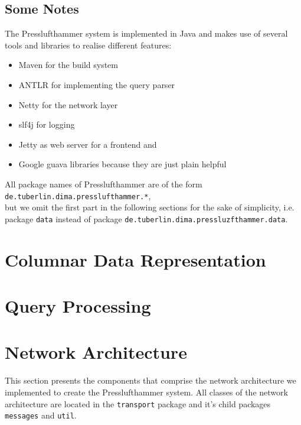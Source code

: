 \subsection{Some Notes}
The Presslufthammer system is implemented in Java and makes use of several tools
and libraries to realise different features:

\begin{itemize}
  \item Maven \cite{maven} for the build system
  \item ANTLR \cite{antlr} for implementing the query parser
  \item Netty \cite{netty} for the network layer
  \item slf4j \cite{slf4j} for logging
  \item Jetty \cite{jetty} as web server for a frontend and
  \item Google guava libraries \cite{guava} because they are just plain helpful
\end{itemize}

All package names of Presslufthammer are of the form\\
\texttt{de.tuberlin.dima.presslufthammer.*},\\
but we omit the first part in the following sections for the sake of simplicity,
i.e. package \texttt{data} instead of package
\texttt{de.tuberlin.dima.pressluzfthammer.data}.


\section{Columnar Data Representation}

\section{Query Processing}

\section{Network Architecture}
  This section presents the components that comprise the network architecture
  we implemented to create the Presslufthammer system.
  All classes of the network architecture are located in the \texttt{transport}
  package and it's child packages \texttt{messages} and \texttt{util}.
  
  
